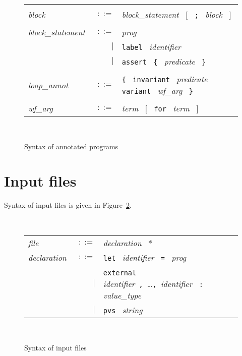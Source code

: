 \documentclass[12pt]{report}
\newcommand{\te}[1]{\texttt{#1}~}
\newcommand{\nt}[1]{\textsl{#1}~}
\begin{document}
\begin{figure}[htbp]
\begin{center}
\begin{tabular}{lrl}
      & & \\[0.1em]

  \nt{block} 
    & $::=$ & \nt{block\_statement}  $[$~ \te{;} \nt{block} $]$ \\

      & & \\[0.1em]

  \nt{block\_statement}
    & $::=$ & \nt{prog} \\
      & $|$ & \te{label}  \nt{identifier} \\
      & $|$ & \te{assert}  \te{\{}  \nt{predicate}  \te{\}} \\

      & & \\[0.1em]

  \nt{loop\_annot}
    & $::=$ & \te{\{}  \te{invariant}  \nt{predicate} 
              \te{variant}  \nt{wf\_arg}  \te{\}} \\
      & & \\[0.1em]

  \nt{wf\_arg} 
    & $::=$ & \nt{term}  $[$~ \te{for} \nt{term} $]$ \\

\end{tabular}\\
\hrulefill
\caption{Syntax of annotated programs}
\label{fig:caml}
\end{center}
\end{figure}

\section{Input files}

Syntax of input files is given in Figure~\ref{fig:input}.

\begin{figure}[htbp]
\begin{center}
\hrulefill\\
\begin{tabular}{lrl}
  \nt{file}
    & $::=$ & \nt{declaration} $*$
  \\[0.1em]

  \nt{declaration}
    & $::=$ & \te{let} \nt{identifier} \te{=} \nt{prog} \\
      & $|$ & \te{external} \nt{identifier}\te{,}\dots\te{,}\nt{identifier}
              \te{:} \nt{value\_type} \\
      & $|$ & \te{pvs} \nt{string}
\end{tabular}\\
\hrulefill
\caption{Syntax of input files}
\label{fig:input}
\end{center}		
\end{figure}
\end{document}
